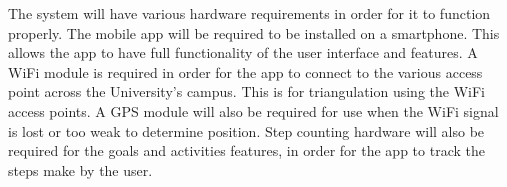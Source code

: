 The system will have various hardware requirements in order for it to function properly. The mobile app will be required to be installed on a smartphone. This allows the app to have full functionality of the user interface and features.
\bigskip
\noindent
A WiFi module is required in order for the app to connect to the various access point across the University's campus. This is for triangulation using the WiFi access points. A GPS module will also be required for use when the WiFi signal is lost or too weak to determine position. Step counting hardware will also be required for the goals and activities features, in order for the app to track the steps make by the user.